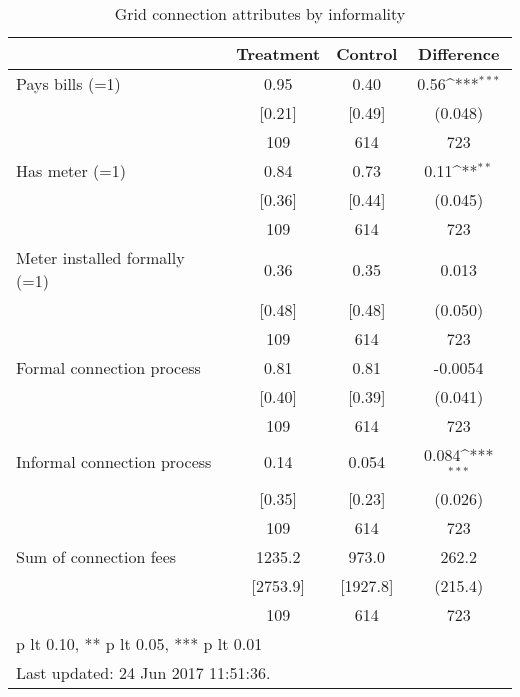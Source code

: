\begin{table}[htbp]\centering
\def\sym#1{\ifmmode^{#1}\else\(^{#1}\)\fi}
\caption{Grid connection attributes by informality \label{tab:"balance"}}
\begin{tabular*}{0.9\hsize}{@{\hskip\tabcolsep\extracolsep\fill}l*{1}{ccc}}
\toprule
                                &Treatment&  Control&Difference         \\
\midrule
Pays bills (=1)                 &     0.95&     0.40&     0.56\sym{***}\\
                                &   [0.21]&   [0.49]&  (0.048)         \\
                                &      109&      614&      723         \\
Has meter (=1)                  &     0.84&     0.73&     0.11\sym{**} \\
                                &   [0.36]&   [0.44]&  (0.045)         \\
                                &      109&      614&      723         \\
Meter installed formally (=1)   &     0.36&     0.35&    0.013         \\
                                &   [0.48]&   [0.48]&  (0.050)         \\
                                &      109&      614&      723         \\
Formal connection process       &     0.81&     0.81&  -0.0054         \\
                                &   [0.40]&   [0.39]&  (0.041)         \\
                                &      109&      614&      723         \\
Informal connection process     &     0.14&    0.054&    0.084\sym{***}\\
                                &   [0.35]&   [0.23]&  (0.026)         \\
                                &      109&      614&      723         \\
Sum of connection fees          &   1235.2&    973.0&    262.2         \\
                                & [2753.9]& [1927.8]&  (215.4)         \\
                                &      109&      614&      723         \\
\bottomrule
\multicolumn{4}{l}{\footnotesize * p lt 0.10, ** p lt 0.05, *** p lt 0.01}\\
\multicolumn{4}{l}{\footnotesize Last updated: 24 Jun 2017 11:51:36.}\\
\end{tabular*}
\end{table}
